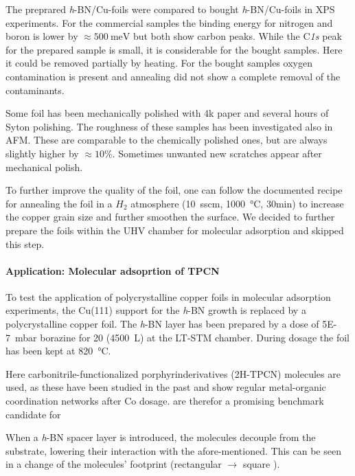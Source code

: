 The preprared \textit{h}-BN/Cu-foils were compared to bought \textit{h}-BN/Cu-foils in XPS experiments. For the commercial samples the binding energy for nitrogen and boron is lower by $\approx \SI{500}{\milli \eV}$ but both show carbon peaks. While the C\textit{1s} peak for the prepared sample is small, it is considerable for the bought samples. Here it could be removed partially by heating. For the bought samples oxygen contamination is present and annealing did not show a complete removal of the contaminants.

Some foil has been mechanically polished with 4k paper and several hours of Syton polishing. The roughness of these samples has been investigated also in AFM. These are comparable to the chemically polished ones, but are always slightly higher by $\approx 10\%$. Sometimes unwanted new scratches appear after mechanical polish.

To further improve the quality of the foil, one can follow the documented recipe for annealing the foil in a $H_2$ atmosphere (\SI{10}{sscm}, \SI{1000}{\celsius}, 30min)\cite{kim_synthesis_2012} to increase the copper grain size and further smoothen the surface. We decided to further prepare the foils within the UHV chamber for molecular adsorption and skipped this step.

\paragraph{Application: Molecular adsoprtion of TPCN}
  To test the application of polycrystalline copper foils in molecular adsorption experiments, the Cu(111) support for the \textit{h}-BN growth is replaced by a polycrystalline copper foil. The \textit{h}-BN layer has been prepared by a dose of \SI{5E-7}{\milli\bar} borazine for \SI{20}{\min} (\SI{4500}{\L}) at the LT-STM chamber. During dosage the foil has been kept at \SI{820}{\celsius}. 
  
  Here carbonitrile-functionalized porphyrinderivatives (2H-TPCN) molecules are used, as these have been studied in the past \cite{urgel_controlling_2015} and show regular metal-organic coordination networks after Co dosage. are therefor a promising benchmark candidate for 
  
  When a \textit{h}-BN spacer layer is introduced, the molecules decouple from the substrate, lowering their interaction with the afore-mentioned. This can be seen in a change of the molecules' footprint (rectangular $\rightarrow$ square ).
  

